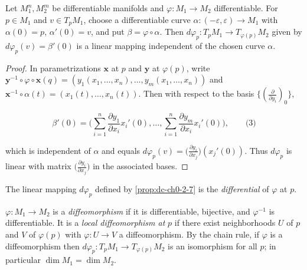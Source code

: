 \begin{proposition}
  \label{prop:dc-ch0-2-7}


  Let $M_1^n,M_2^m$ be differentiable manifolds and $\varphi:M_1\to M_2$
  differentiable. For $p\in M_1$ and $v\in T_pM_1$, choose a differentiable curve
  $\alpha:(-\varepsilon,\varepsilon)\to M_1$ with $\alpha(0)=p$, $\alpha'(0)=v$, and
  put $\beta=\varphi\circ\alpha$. Then
  $d\varphi_p:T_pM_1\to T_{\varphi(p)}M_2$ given by $d\varphi_p(v)=\beta'(0)$ is a
  linear mapping independent of the chosen curve $\alpha$.
\end{proposition}
\begin{proof}
  \sketch

  In parametrizations $\mathbf{x}$ at $p$ and $\mathbf{y}$ at $\varphi(p)$,
  write $\mathbf{y}^{-1}\circ\varphi\circ\mathbf{x}(q)=(y_1(x_1,\dots,x_n),\dots,y_m(x_1,\dots,x_n))$
  and $\mathbf{x}^{-1}\circ\alpha(t)=(x_1(t),\dots,x_n(t))$. Then with respect to
  the basis $\{(\frac{\partial}{\partial y_i})_0\}$,

  $$
  \beta'(0)=\Big(\sum_{i=1}^n\frac{\partial y_1}{\partial x_i}x_i'(0),\dots,\sum_{i=1}^n\frac{\partial y_m}{\partial x_i}x_i'(0)\Big),\qquad\text{(3)}
  $$

  which is independent of $\alpha$ and equals
  $d\varphi_p(v)=\big(\frac{\partial y_i}{\partial x_j}\big)(x_j'(0))$. Thus
  $d\varphi_p$ is linear with matrix $\big(\frac{\partial y_i}{\partial x_j}\big)$
  in the associated bases.
\end{proof}

\begin{definition}[differential]
  \label{def:dc-ch0-2-8}


  The linear mapping $d\varphi_p$ defined by \cref{prop:dc-ch0-2-7} is the \emph{differential}
  of $\varphi$ at $p$.
\end{definition}

\begin{definition}
  \label{def:dc-ch0-2-9}


  $\varphi:M_1\to M_2$ is a \emph{diffeomorphism} if it is differentiable, bijective, and
  $\varphi^{-1}$ is differentiable. It is a \emph{local diffeomorphism at} $p$ if there
  exist neighborhoods $U$ of $p$ and $V$ of $\varphi(p)$ with $\varphi:U\to V$ a
  diffeomorphism. By the chain rule, if $\varphi$ is a diffeomorphism then
  $d\varphi_p:T_pM_1\to T_{\varphi(p)}M_2$ is an isomorphism for all $p$; in
  particular $\dim M_1=\dim M_2$.
\end{definition}

